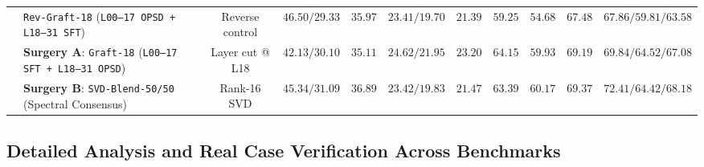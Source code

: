\documentclass[11pt,a4paper]{article}
\begin{document}
\begin{table}[t]
{\begin{tabular}{llccccccccc}
\midrule
{}
 & \texttt{Rev-Graft-18} (\texttt{L00--17 OPSD + L18--31 SFT}) & Reverse control & $46.50 / 29.33$ & $35.97$ & $23.41 / 19.70$ & $21.39$ & $59.25$ & $54.68$ & $67.48$ & $67.86 / 59.81 / 63.58$ \\
 & \textbf{Surgery A}: \texttt{Graft-18} (\texttt{L00--17 SFT + L18--31 OPSD}) & Layer cut @ L18 & $42.13 / 30.10$ & $35.11$ & $24.62 / \mathbf{21.95}$ & $\mathbf{23.20}$ & $\mathbf{64.15}$ & $59.93$ & $69.19$ & $69.84 / \mathbf{64.52} / \mathbf{67.08}$ \\
 & \textbf{Surgery B}: \texttt{SVD-Blend-50/50} (Spectral Consensus) & Rank-16 SVD & $45.34 / 31.09$ & $\mathbf{36.89}$ & $23.42 / 19.83$ & $\mathbf{21.47}$ & $63.39$ & $\mathbf{60.17}$ & $\mathbf{69.37}$ & $\mathbf{72.41} / 64.42 / \mathbf{68.18}$ \\
\bottomrule
\end{tabular}%
}
\end{table}

\subsection{Detailed Analysis and Real Case Verification Across Benchmarks}
\end{document}
